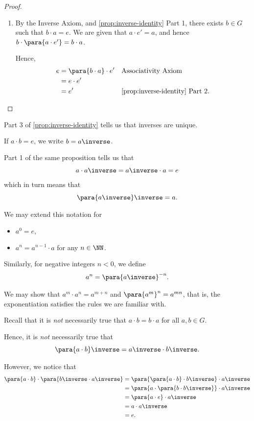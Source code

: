\begin{proof}
\begin{enumerate}
        \item By the Inverse Axiom, and \autoref{prop:inverse-identity} Part 1, there exists \(b \in G\) such that \(b \cdot a = e\). We are given that \(a \cdot e' = a\), and hence \(b \cdot \para{a \cdot e'} = b \cdot a\).

        Hence,
        \begin{align*}
            e &= \para{b \cdot a} \cdot e' && \text{Associativity Axiom} \\
            &= e \cdot e' \\
            &= e' && \text{\autoref{prop:inverse-identity} Part 2}.
        \end{align*}
    \end{enumerate}    
\end{proof}

Part 3 of \autoref{prop:inverse-identity} tells us that inverses are unique.

\begin{notation}
    If \(a \cdot b = e\), we write \(b = a \inverse\).
\end{notation}

Part 1 of the same proposition tells us that
\[
    a \cdot a \inverse = a \inverse \cdot a = e
\]
which in turn means that
\[
    \para{a \inverse} \inverse = a.
\]

\begin{notation}
    We may extend this notation for
    \begin{itemize}
        \item \(a^0 = e\),
        \item \(a^n = a^{n - 1} \cdot a\) for any \(n \in \NN\).
    \end{itemize}

    Similarly, for negative integers \(n < 0\), we define
    \[
        a^n = \para{a \inverse}^{-n}.
    \]
\end{notation}

We may show that \(a^m \cdot a^n = a^{m + n}\) and \(\para{a^m}^n = a^{mn}\), that is, the exponentiation satisfies the rules we are familiar with.

Recall that it is \emph{not} necessarily true that \(a \cdot b = b \cdot a\) for all \(a, b \in G\).

Hence, it is \emph{not} necessarily true that
\[
    \para{a \cdot b}\inverse = a \inverse \cdot b \inverse.
\]

However, we notice that
\begin{align*}
    \para{a \cdot b} \cdot \para{b \inverse \cdot a \inverse} &= \para{\para{a \cdot b} \cdot b\inverse} \cdot a\inverse \\
    &= \para{a \cdot \para{b \cdot b\inverse}} \cdot a\inverse \\
    &= \para{a \cdot e} \cdot a\inverse \\
    &= a \cdot a\inverse \\
    &= e.
\end{align*}

